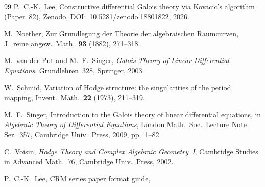\documentclass[11pt]{article}
\theoremstyle{plain}
\theoremstyle{definition}
\theoremstyle{remark}
\begin{document}
\begin{thebibliography}{99}
P.~C.-K.~Lee, Constructive differential Galois theory via Kovacic's algorithm (Paper~82),
Zenodo, DOI:~10.5281/zenodo.18801822, 2026.

M.~Noether, Zur Grundlegung der Theorie der algebraischen Raumcurven,
J.~reine angew.\ Math.~\textbf{93} (1882), 271--318.

M.~van der Put and M.~F.~Singer, \emph{Galois Theory of Linear Differential Equations},
Grundlehren~328, Springer, 2003.

W.~Schmid, Variation of Hodge structure: the singularities of the period mapping,
Invent.\ Math.~\textbf{22} (1973), 211--319.

M.~F.~Singer, Introduction to the Galois theory of linear differential equations,
in \emph{Algebraic Theory of Differential Equations}, London Math.\ Soc.\ Lecture Note Ser.~357,
Cambridge Univ.\ Press, 2009, pp.~1--82.

C.~Voisin, \emph{Hodge Theory and Complex Algebraic Geometry~I},
Cambridge Studies in Advanced Math.~76, Cambridge Univ.\ Press, 2002.

P.~C.-K.~Lee, CRM series paper format guide,

\end{thebibliography}
\end{document}

